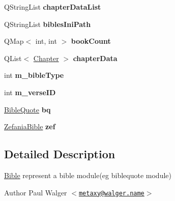 \begin{DoxyCompactItemize}
\item 
\hypertarget{classBible_a724de0aaf066754af1b6aa50ea554e62}{
QStringList {\bfseries chapterDataList}}
\label{classBible_a724de0aaf066754af1b6aa50ea554e62}

\item 
\hypertarget{classBible_a8ad14dd4def142176f2d04ffb213af94}{
QStringList {\bfseries biblesIniPath}}
\label{classBible_a8ad14dd4def142176f2d04ffb213af94}

\item 
\hypertarget{classBible_aed92fc6bb94809029cecfa076ae99c23}{
QMap$<$ int, int $>$ {\bfseries bookCount}}
\label{classBible_aed92fc6bb94809029cecfa076ae99c23}

\item 
\hypertarget{classBible_a1dca3a01d8a18110a1cd24337deeca80}{
QList$<$ \hyperlink{structChapter}{Chapter} $>$ {\bfseries chapterData}}
\label{classBible_a1dca3a01d8a18110a1cd24337deeca80}

\item 
\hypertarget{classBible_a2442c9bfc7b817472d62f429756ffb53}{
int {\bfseries m\_\-bibleType}}
\label{classBible_a2442c9bfc7b817472d62f429756ffb53}

\item 
\hypertarget{classBible_ab6dc84753215ebe5fc4571c5db781cb8}{
int {\bfseries m\_\-verseID}}
\label{classBible_ab6dc84753215ebe5fc4571c5db781cb8}

\item 
\hypertarget{classBible_a378fb5e8a71400bbcc14aa0bf33a6082}{
\hyperlink{classBibleQuote}{BibleQuote} {\bfseries bq}}
\label{classBible_a378fb5e8a71400bbcc14aa0bf33a6082}

\item 
\hypertarget{classBible_abae8c0e258ecb53dcf89563c7eac3fef}{
\hyperlink{classZefaniaBible}{ZefaniaBible} {\bfseries zef}}
\label{classBible_abae8c0e258ecb53dcf89563c7eac3fef}

\end{DoxyCompactItemize}


\subsection{Detailed Description}
\hyperlink{classBible}{Bible} represent a bible module(eg biblequote module)

\begin{DoxyAuthor}{Author}
Paul Walger $<$\href{mailto:metaxy@walger.name}{\tt metaxy@walger.name}$>$ 
\end{DoxyAuthor}


